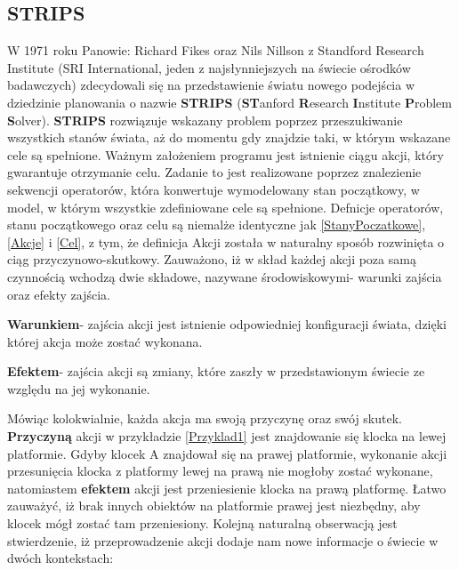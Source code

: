    \subsection{STRIPS}
    \label{STRIPSRozdział}
    W 1971 roku Panowie: Richard Fikes oraz Nils Nillson z Standford Research Institute (SRI International, 
    jeden z najsłynniejszych na świecie ośrodków badawczych) zdecydowali się na przedstawienie światu
    nowego podejścia w dziedzinie planowania o nazwie \textbf{STRIPS} (\textbf{ST}anford \textbf{R}esearch \textbf{I}nstitute
    \textbf{P}roblem \textbf{S}olver)\cite{STRIPS}.
    \textbf{STRIPS} rozwiązuje wskazany problem poprzez przeszukiwanie wszystkich stanów świata, aż do momentu
    gdy znajdzie taki, w którym wskazane cele są spełnione. Ważnym założeniem programu jest istnienie
    ciągu akcji, który gwarantuje otrzymanie celu. Zadanie to jest realizowane poprzez znalezienie
    sekwencji operatorów, która konwertuje wymodelowany stan początkowy, w model, w którym wszystkie 
    zdefiniowane cele są spełnione. Defnicje operatorów, stanu początkowego oraz celu są niemalże identyczne jak 
    \ref{StanyPoczatkowe}, \ref{Akcje} i \ref{Cel}, z tym, że definicja Akcji została w naturalny sposób rozwinięta o ciąg przyczynowo-skutkowy. Zauważono, iż w skład każdej akcji 
    poza samą czynnością wchodzą dwie składowe, nazywane środowiskowymi- warunki zajścia oraz efekty zajścia. 
    \begin{definition}
        \label{WarunekAkcji}
        \textbf{Warunkiem}- zajścia akcji jest istnienie odpowiedniej konfiguracji świata, dzięki której akcja może zostać wykonana.
    \end{definition}
    \begin{definition}
        \label{EfektAkcji}
        \textbf{Efektem}- zajścia akcji są zmiany, które zaszły w przedstawionym świecie ze względu na jej wykonanie.
    \end{definition}
    Mówiąc kolokwialnie, każda akcja ma swoją przyczynę oraz swój skutek. \textbf{Przyczyną} akcji w przykładzie \ref{Przyklad1} jest znajdowanie się klocka na lewej platformie. Gdyby
    klocek A znajdował się na prawej platformie, wykonanie akcji przesunięcia klocka z platformy lewej na prawą nie mogłoby zostać wykonane, natomiastem \textbf{efektem} akcji jest 
    przeniesienie klocka na prawą platformę. Łatwo zauważyć, iż brak innych obiektów na platformie prawej jest niezbędny, aby klocek mógł zostać tam przeniesiony.
    Kolejną naturalną obserwacją jest stwierdzenie, iż przeprowadzenie akcji dodaje nam nowe informacje o świecie w dwóch kontekstach:

